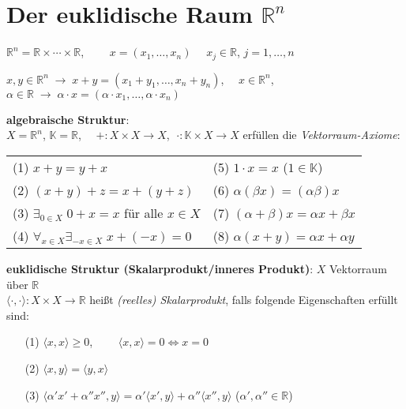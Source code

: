 \section{%
    \texorpdfstring{Der euklidische Raum $\mathbb{R}^n$}%
    {Der euklidische Raum ℝⁿ}%
}

$\mathbb{R}^n = \mathbb{R} \times \cdots \times \mathbb{R}$,
$\qquad x = (x_1, \ldots, x_n) \quad$ $x_j \in \mathbb{R}$,
$j = 1, \ldots, n$

$x, y \in \mathbb{R}^n \;\rightarrow\; x + y = (x_1 + y_1, \ldots, x_n + y_n)$,
$\quad x \in \mathbb{R}^n$, $\alpha \in \mathbb{R} \;\rightarrow\;
\alpha \cdot x = (\alpha \cdot x_1, \ldots, \alpha \cdot x_n)$

\textbf{algebraische Struktur}: \\
$X = \mathbb{R}^n$, $\mathbb{K} = \mathbb{R}$,
$\quad \boldsymbol{+}: X \times X \rightarrow X$, $\;\boldsymbol{\cdot}:
\mathbb{K} \times X \rightarrow X$
erfüllen die \emph{Vektorraum-Axiome}:

\begin{tabular}{p{8cm}p{8cm}}
    (1) $x + y = y + x$ &
    (5) $1 \cdot x = x$ ($1 \in \mathbb{K}$) \\
    (2) $(x + y) + z = x + (y + z)$ &
    (6) $\alpha (\beta x) = (\alpha \beta) x$ \\
    (3) $\exists_{0 \in X}\; 0 + x = x$ für alle $x \in X$ &
    (7) $(\alpha + \beta) x = \alpha x + \beta x$ \\
    (4) $\forall_{x \in X} \exists_{-x \in X}\; x + (-x) = 0$ &
    (8) $\alpha (x + y) = \alpha x + \alpha y$
\end{tabular}

\vspace{12pt}
\linie

\textbf{euklidische Struktur (Skalarprodukt/inneres Produkt)}:
$X$ Vektorraum über $\mathbb{R}$ \\
$\langle \cdot, \cdot \rangle:
X \times X \rightarrow \mathbb{R}$ heißt \emph{(reelles) Skalarprodukt}, falls
folgende Eigenschaften erfüllt sind:

\begin{itemize}
    \item[(1)] $\langle x, x \rangle \ge 0$,
    $\qquad \langle x, x \rangle = 0 \Leftrightarrow x = 0$

    \item[(2)] $\langle x, y \rangle = \langle y, x \rangle$

    \item[(3)] $\langle \alpha' x' + \alpha'' x'', y \rangle =
    \alpha' \langle x', y \rangle + \alpha'' \langle x'', y \rangle$
    \qquad ($\alpha', \alpha'' \in \mathbb{R}$)
\end{itemize}

